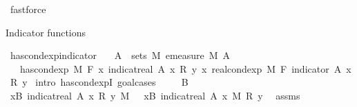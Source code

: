 \begin{isabellebody}
\ fastforce%
\endisatagproof
{\isafoldproof}%
%
\isadelimproof
%
\endisadelimproof
%
\isadelimdocument
%
\endisadelimdocument
%
\isatagdocument
%
\isamarkuptrue%
%
\endisatagdocument
{\isafolddocument}%
%
\isadelimdocument
%
\endisadelimdocument
%
\begin{isamarkuptext}%
Indicator functions%
\end{isamarkuptext}\isamarkuptrue%
\isamarkupfalse%
\ has{\isacharunderscore}{\kern0pt}cond{\isacharunderscore}{\kern0pt}exp{\isacharunderscore}{\kern0pt}indicator{\isacharcolon}{\kern0pt}\isanewline
\ \ \ {\isachardoublequoteopen}A\ {\isasymin}\ sets\ M{\isachardoublequoteclose}\ {\isachardoublequoteopen}emeasure\ M\ A\ {\isacharless}{\kern0pt}\ {\isasyminfinity}{\isachardoublequoteclose}\isanewline
\ \ \ {\isachardoublequoteopen}has{\isacharunderscore}{\kern0pt}cond{\isacharunderscore}{\kern0pt}exp\ M\ F\ {\isacharparenleft}{\kern0pt}{\isasymlambda}x{\isachardot}{\kern0pt}\ indicat{\isacharunderscore}{\kern0pt}real\ A\ x\ {\isacharasterisk}{\kern0pt}\isactrlsub R\ y{\isacharparenright}{\kern0pt}\ {\isacharparenleft}{\kern0pt}{\isasymlambda}x{\isachardot}{\kern0pt}\ real{\isacharunderscore}{\kern0pt}cond{\isacharunderscore}{\kern0pt}exp\ M\ F\ {\isacharparenleft}{\kern0pt}indicator\ A{\isacharparenright}{\kern0pt}\ x\ {\isacharasterisk}{\kern0pt}\isactrlsub R\ y{\isacharparenright}{\kern0pt}{\isachardoublequoteclose}\isanewline
%
\isadelimproof
%
\endisadelimproof
%
\isatagproof
{}\isamarkupfalse%
\ {\isacharparenleft}{\kern0pt}intro\ has{\isacharunderscore}{\kern0pt}cond{\isacharunderscore}{\kern0pt}expI{\isacharprime}{\kern0pt}{\isacharcomma}{\kern0pt}\ goal{\isacharunderscore}{\kern0pt}cases{\isacharparenright}{\kern0pt}\isanewline
\ \ \isamarkupfalse%
\ {\isacharparenleft}{\kern0pt}{}\ B{\isacharparenright}{\kern0pt}\isanewline
\ \ \isamarkupfalse%
\ {\isachardoublequoteopen}{\isasymintegral}x{\isasymin}B{\isachardot}{\kern0pt}\ {\isacharparenleft}{\kern0pt}indicat{\isacharunderscore}{\kern0pt}real\ A\ x\ {\isacharasterisk}{\kern0pt}\isactrlsub R\ y{\isacharparenright}{\kern0pt}\ {\isasympartial}M\ \ {\isacharequal}{\kern0pt}\ {\isacharparenleft}{\kern0pt}{\isasymintegral}x{\isasymin}B{\isachardot}{\kern0pt}\ indicat{\isacharunderscore}{\kern0pt}real\ A\ x\ {\isasympartial}M{\isacharparenright}{\kern0pt}\ {\isacharasterisk}{\kern0pt}\isactrlsub R\ y{\isachardoublequoteclose}\ \isamarkupfalse%
\ assms\ \isamarkupfalse%

\end{isabellebody}
